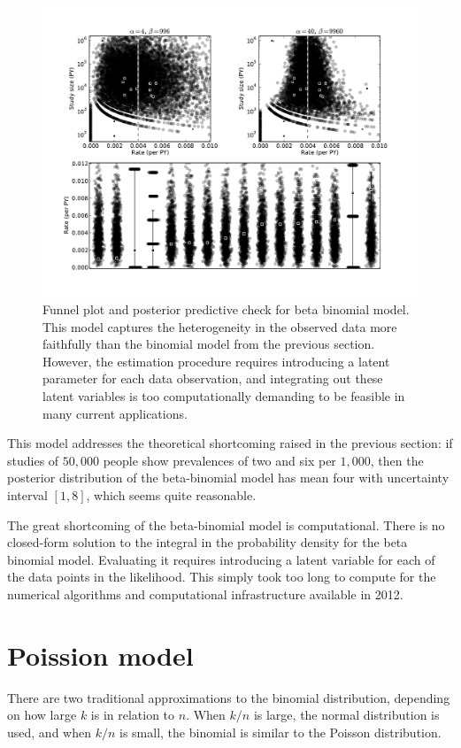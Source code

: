 \begin{figure}[ht]
\begin{center}
\includegraphics[width=\textwidth]{beta-binomial-funnel.pdf}
\end{center}
\caption{Funnel plot and posterior predictive check for beta binomial
  model. This model captures the heterogeneity in the observed data
  more faithfully than the binomial model from the previous section.
  However, the estimation procedure requires introducing a latent
  parameter for each data observation, and integrating out these
  latent variables is too computationally demanding to be feasible in
  many current applications.}
\label{rate-model-beta-binomial-funnel}
\end{figure}

This model addresses the theoretical shortcoming raised in the
previous section: if studies of $50,000$ people show prevalences of
two and six per $1,000$, then the posterior distribution of the
beta-binomial model has mean four with uncertainty interval $[1,8]$,
which seems quite reasonable.

The great shortcoming of the beta-binomial model is computational.
There is no closed-form solution to the integral in the probability
density for the beta binomial model.  Evaluating it requires
introducing a latent variable for each of the data points in the
likelihood.  This simply took too long to compute for the numerical
algorithms and computational infrastructure available in 2012.

\section{Poission model}
There are two traditional approximations to the binomial distribution,
depending on how large $k$ is in relation to $n$.  When $k/n$ is
large, the normal distribution is used, and when $k/n$ is small, the
binomial is similar to the Poisson distribution.

